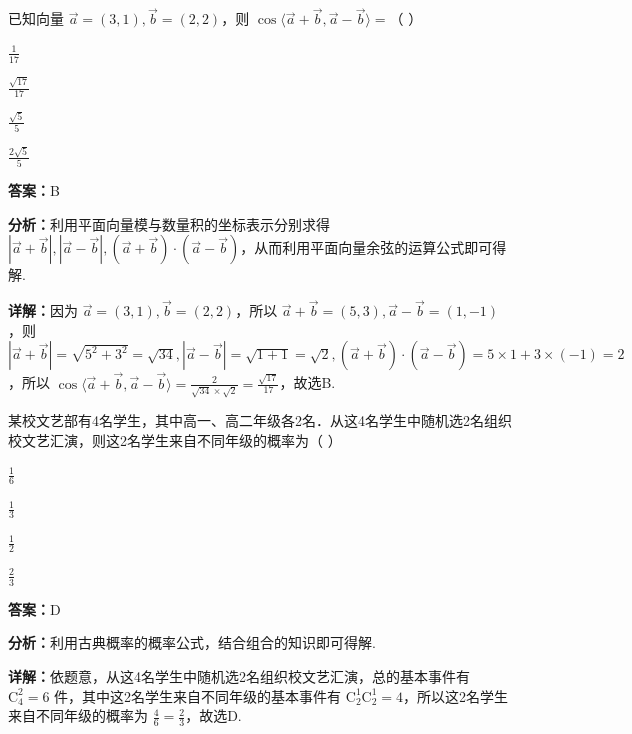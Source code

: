\begin{question}[points=5]
已知向量 $\vec{a} = (3,1), \vec{b} = (2,2)$，则 $\cos\langle \vec{a}+\vec{b}, \vec{a}-\vec{b} \rangle =$（    ）
\begin{choices}
  \item $\frac{1}{17}$
  \item $\frac{\sqrt{17}}{17}$
  \item $\frac{\sqrt{5}}{5}$
  \item $\frac{2\sqrt{5}}{5}$
\end{choices}
\begin{solution}
\textbf{答案：}B

\textbf{分析：}利用平面向量模与数量积的坐标表示分别求得 $|\vec{a}+\vec{b}|, |\vec{a}-\vec{b}|, (\vec{a}+\vec{b})\cdot(\vec{a}-\vec{b})$，从而利用平面向量余弦的运算公式即可得解.

\textbf{详解：}因为 $\vec{a} = (3,1), \vec{b} = (2,2)$，所以 $\vec{a}+\vec{b} = (5,3), \vec{a}-\vec{b} = (1,-1)$，则 $|\vec{a}+\vec{b}| = \sqrt{5^2+3^2} = \sqrt{34}, |\vec{a}-\vec{b}| = \sqrt{1+1} = \sqrt{2}, (\vec{a}+\vec{b})\cdot(\vec{a}-\vec{b}) = 5\times1+3\times(-1)=2$，所以 $\cos\langle \vec{a}+\vec{b}, \vec{a}-\vec{b} \rangle = \frac{2}{\sqrt{34}\times\sqrt{2}} = \frac{\sqrt{17}}{17}$，故选B.
\end{solution}
\end{question}

\begin{question}[points=5]
某校文艺部有4名学生，其中高一、高二年级各2名．从这4名学生中随机选2名组织校文艺汇演，则这2名学生来自不同年级的概率为（    ）
\begin{choices}
  \item $\frac{1}{6}$
  \item $\frac{1}{3}$
  \item $\frac{1}{2}$
  \item $\frac{2}{3}$
\end{choices}
\begin{solution}
\textbf{答案：}D

\textbf{分析：}利用古典概率的概率公式，结合组合的知识即可得解.

\textbf{详解：}依题意，从这4名学生中随机选2名组织校文艺汇演，总的基本事件有 $\mathrm{C}_4^2 = 6$ 件，其中这2名学生来自不同年级的基本事件有 $\mathrm{C}_2^1 \mathrm{C}_2^1 = 4$，所以这2名学生来自不同年级的概率为 $\frac{4}{6} = \frac{2}{3}$，故选D.
\end{solution}
\end{question}

